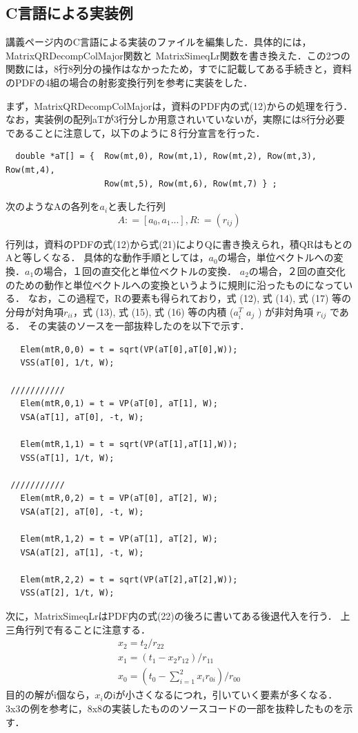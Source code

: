 \documentclass[11pt]{jarticle}
\begin{document}
\subsection{C言語による実装例}
講義ページ内のC言語による実装のファイルを編集した．具体的には，MatrixQRDecompColMajor関数と
MatrixSimeqLr関数を書き換えた．この2つの関数には，8行8列分の操作はなかったため，すでに記載してある手続きと，資料のPDFの4組の場合の射影変換行列を参考に実装をした．

まず，MatrixQRDecompColMajorは，資料のPDF内の式(12)からの処理を行う． なお，実装例の配列aTが3行分しか用意されいていないが，実際には8行分必要であることに注意して，以下のように８行分宣言を行った．
\begin{verbatim}
  double *aT[] = {  Row(mt,0), Row(mt,1), Row(mt,2), Row(mt,3), Row(mt,4), 
                    Row(mt,5), Row(mt,6), Row(mt,7) } ;
\end{verbatim}
次のようなAの各列を$a_{i}$と表した行列
\begin{equation}
  A \colon = [a_{0}, a_{1}...], R \colon = (r_{ij})
\end{equation}

行列は，資料のPDFの式(12)から式(21)によりQに書き換えられ，積QRはもとのAと等しくなる．
具体的な動作手順としては，$a_0$の場合，単位ベクトルへの変換．$a_1$の場合，１回の直交化と単位ベクトルの変換．
$a_2$の場合，２回の直交化のための動作と単位ベクトルへの変換というように規則に沿ったものになっている．
なお，この過程で，Rの要素も得られており，式 (12), 式 (14), 式 (17) 等の分母が対角項$r_{ii}$，式 (13),
式 (15), 式 (16) 等の内積 ($a^{T}_{i}$ $a_j$ ) が非対角項 $r_{ij}$ である．
その実装のソースを一部抜粋したのを以下で示す．

\begin{verbatim}
   Elem(mtR,0,0) = t = sqrt(VP(aT[0],aT[0],W));
   VSS(aT[0], 1/t, W);

 ///////////
   Elem(mtR,0,1) = t = VP(aT[0], aT[1], W);
   VSA(aT[1], aT[0], -t, W);

   Elem(mtR,1,1) = t = sqrt(VP(aT[1],aT[1],W));
   VSS(aT[1], 1/t, W);

 ///////////
   Elem(mtR,0,2) = t = VP(aT[0], aT[2], W);
   VSA(aT[2], aT[0], -t, W);

   Elem(mtR,1,2) = t = VP(aT[1], aT[2], W);
   VSA(aT[2], aT[1], -t, W);

   Elem(mtR,2,2) = t = sqrt(VP(aT[2],aT[2],W));
   VSS(aT[2], 1/t, W);
\end{verbatim}

次に，MatrixSimeqLrはPDF内の式(22)の後ろに書いてある後退代入を行う．
上三角行列で有ることに注意する．
\begin{eqnarray}
  x_2 = t_2 / r_{22}\\
  x_1 = (t_1 - x_2 r_12)/r_{11}\\
  x_0 = (t_0 - \sum_{i=1}^{2} x_i r_{0i})/r_{00}
\end{eqnarray}
目的の解がi個なら，$x_{i}$のiが小さくなるにつれ，引いていく要素が多くなる．
3x3の例を参考に，8x8の実装したもののソースコードの一部を抜粋したものを示す．
\end{document}
